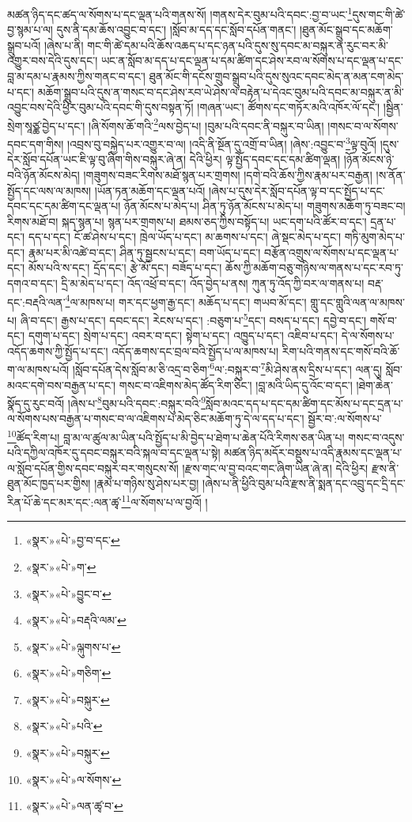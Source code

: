མཚན་ཉིད་དང་ཚད་ལ་སོགས་པ་དང་ལྡན་པའི་གནས་སོ། །གནས་དེར་བུམ་པའི་དབང་:བྱ་བ་ཡང་\footnote{«སྣར་»«པེ་»བྱ་བ་དང་}དུས་གང་གི་ཚེ་བྱ་སྙམ་པ་ལ། དུས་ནི་དམ་ཆོས་འབྱུང་བ་དང་། །སློབ་མ་དད་དང་སློབ་དཔོན་གནང་། །ཐུན་མོང་སྒྲུབ་དང་མཆོག་སྒྲུབ་པའོ། །ཞེས་པ་ནི། གང་གི་ཚེ་དམ་པའི་ཆོས་འཆད་པ་དང་ཉན་པའི་དུས་སུ་དབང་མ་བསྐུར་ན་རུང་བར་མི་འགྱུར་བས་དེའི་དུས་དང་། ཡང་ན་སློབ་མ་དད་པ་དང་ལྡན་པ་དམ་ཚིག་དང་ཤེས་རབ་ལ་སོགས་པ་དང་ལྡན་པ་དང་བླ་མ་དམ་པ་རྣམས་ཀྱིས་གནང་བ་དང་། ཐུན་མོང་གི་དངོས་གྲུབ་སྒྲུབ་པའི་དུས་སུའང་དབང་མེད་ན་མན་ངག་མེད་པ་དང་། མཆོག་སྒྲུབ་པའི་དུས་ན་གསང་བ་དང་ཤེས་རབ་ཡེ་ཤེས་ལ་བརྟེན་པ་དེའང་བུམ་པའི་དབང་མ་བསྐུར་ན་མི་འབྱུང་བས་དེའི་ཕྱིར་བུམ་པའི་དབང་གི་དུས་བསྟན་ཏོ། །གཞན་ཡང་། ཚོགས་དང་གཏོར་མའི་འཁོར་ལོ་དང་། །སྦྱིན་སྲེག་སཱཙྪ་བྱེད་པ་དང་། །ཞི་སོགས་ཆོ་གའི་\footnote{«སྣར་»«པེ་»ག་}ལས་བྱེད་པ། །བུམ་པའི་དབང་ནི་བསྐུར་བ་ཡིན། །གསང་བ་ལ་སོགས་དབང་དག་གིས། །འབྲས་བུ་བསྐྱེད་པར་འགྱུར་བ་ལ། །འདི་ནི་སྔོན་དུ་འགྲོ་བ་ཡིན། །ཞེས་:འབྱུང་བ་\footnote{«སྣར་»«པེ་»བྱུང་བ་}ལྟ་བུའོ། །དུས་དེར་སློབ་དཔོན་ཡང་ཇི་ལྟ་བུ་ཞིག་གིས་བསྐུར་ཞེ་ན། དེའི་ཕྱིར། ལྟ་སྤྱོད་དབང་དང་དམ་ཚིག་ལྡན། །ཉོན་མོངས་ཉེ་བའི་ཉོན་མོངས་མེད། །གཟུགས་བཟང་རིགས་མཐོ་སྙན་པར་གྲགས། །དགེ་བའི་ཆོས་ཀྱིས་རྣམ་པར་བརྒྱན། །ས་ནོན་སྤྱོད་དང་ལས་ལ་མཁས། །ཡོན་ཏན་མཆོག་དང་ལྡན་པའོ། །ཞེས་པ་དུས་དེར་སློབ་དཔོན་ལྟ་བ་དང་སྤྱོད་པ་དང་དབང་དང་དམ་ཚིག་དང་ལྡན་པ། ཉོན་མོངས་པ་མེད་པ། ཤིན་ཏུ་ཉོན་མོངས་པ་མེད་པ། གཟུགས་མཆོག་ཏུ་བཟང་བ། རིགས་མཐོ་བ། སྐད་སྙན་པ། སྙན་པར་གྲགས་པ། ཐམས་ཅད་ཀྱིས་བསྟོད་པ། ཡང་དག་པའི་ཚོར་བ་དང་། དྲན་པ་དང་། དད་པ་དང་། ངོ་ཚ་ཤེས་པ་དང་། ཁྲེལ་ཡོད་པ་དང་། མ་ཆགས་པ་དང་། ཞེ་སྡང་མེད་པ་དང་། གཏི་མུག་མེད་པ་དང་། རྣམ་པར་མི་འཚེ་བ་དང་། ཤིན་ཏུ་སྦྱངས་པ་དང་། བག་ཡོད་པ་དང་། བརྩོན་འགྲུས་ལ་སོགས་པ་དང་ལྡན་པ་དང་། མོས་པའི་ས་དང་། དྲོད་དང་། རྩེ་མོ་དང་། བཟོད་པ་དང་། ཆོས་ཀྱི་མཆོག་བཅུ་གཉིས་ལ་གནས་པ་དང་རབ་ཏུ་དགའ་བ་དང་། དྲི་མ་མེད་པ་དང་། འོད་འཕྲོ་བ་དང་། འོད་བྱེད་པ་ནས། ཀུན་ཏུ་འོད་ཀྱི་བར་ལ་གནས་པ། བརྡ་དང་:བརྡའི་ལན་\footnote{«སྣར་»«པེ་»བརྡའི་ལམ་}ལ་མཁས་པ། གར་དང་ཕྱག་རྒྱ་དང་། མཆོད་པ་དང་། གཡབ་མོ་དང་། གླུ་དང་གླུའི་ལན་ལ་མཁས་པ། ཞི་བ་དང་། རྒྱས་པ་དང་། དབང་དང་། རེངས་པ་དང་། :བཅུག་པ་\footnote{«སྣར་»«པེ་»ལྐུགས་པ་}དང་། བསད་པ་དང་། དབྱེ་བ་དང་། གསོ་བ་དང་། དགུག་པ་དང་། སྲེག་པ་དང་། འབར་བ་དང་། སྟེག་པ་དང་། འཁྱུད་པ་དང་། འཇིབ་པ་དང་། དེ་ལ་སོགས་པ་འདོད་ཆགས་ཀྱི་སྤྱོད་པ་དང་། འདོད་ཆགས་དང་བྲལ་བའི་སྤྱོད་པ་ལ་མཁས་པ། རིག་པའི་གནས་དང་གསོ་བའི་ཆོ་ག་ལ་མཁས་པའོ། །སློབ་དཔོན་དེས་སློབ་མ་ཅི་འདྲ་བ་ཅིག་\footnote{«སྣར་»«པེ་»གཅིག་}ལ་:བསྐུར་བ་\footnote{«སྣར་»«པེ་»བསྐུར་}མི་ཤེས་ནས་དྲིས་པ་དང་། ལན་དུ། སློབ་མའང་དགེ་བས་བརྒྱན་པ་དང་། གསང་བ་འཇིགས་མེད་ཚོད་རིག་ཅིང་། །བླ་མའི་ཡིད་དུ་འོང་བ་དང་། །ཐེག་ཆེན་སྣོད་དུ་རུང་བའོ། །ཞེས་པ་\footnote{«སྣར་»«པེ་»པའི་}བུམ་པའི་དབང་:བསྐུར་བའི་\footnote{«སྣར་»«པེ་»བསྐུར་}སློབ་མའང་དད་པ་དང་དམ་ཚིག་དང་མོས་པ་དང་དྲན་པ་ལ་སོགས་པས་བརྒྱན་པ་གསང་བ་ལ་འཇིགས་པ་མེད་ཅིང་མཆོག་ཏུ་དེ་ལ་དད་པ་དང་། སྦྱོར་བ་:ལ་སོགས་པ་\footnote{«སྣར་»«པེ་»ལ་སོགས་}ཚོད་རིག་པ། བླ་མ་ལ་ཚུལ་མ་ཡིན་པའི་སྤྱོད་པ་མི་བྱེད་པ་ཐེག་པ་ཆེན་པོའི་རིགས་ཅན་ཡིན་པ། གསང་བ་འདུས་པའི་དཀྱིལ་འཁོར་དུ་དབང་བསྐུར་བའི་སྐལ་བ་དང་ལྡན་པ་སྟེ། མཚན་ཉིད་མདོར་བསྡུས་པ་འདི་རྣམས་དང་ལྡན་པ་ལ་སློབ་དཔོན་གྱིས་དབང་བསྐུར་བར་གསུངས་སོ། །རྫས་གང་ལ་བྱ་བའང་གང་ཞིག་ཡིན་ཞེ་ན། དེའི་ཕྱིར། རྫས་ནི་ཐུན་མོང་ཁྱད་པར་གྱིས། །རྣམ་པ་གཉིས་སུ་ཤེས་པར་བྱ། །ཞེས་པ་ནི་ཕྱིའི་བུམ་པའི་རྫས་ནི་སྨན་དང་འབྲུ་དང་དྲི་དང་རིན་པོ་ཆེ་དང་མར་དང་:ལན་ཚྭ་\footnote{«སྣར་»«པེ་»ལན་ཚྭ་བ་}ལ་སོགས་པ་ལ་བྱའོ། །
